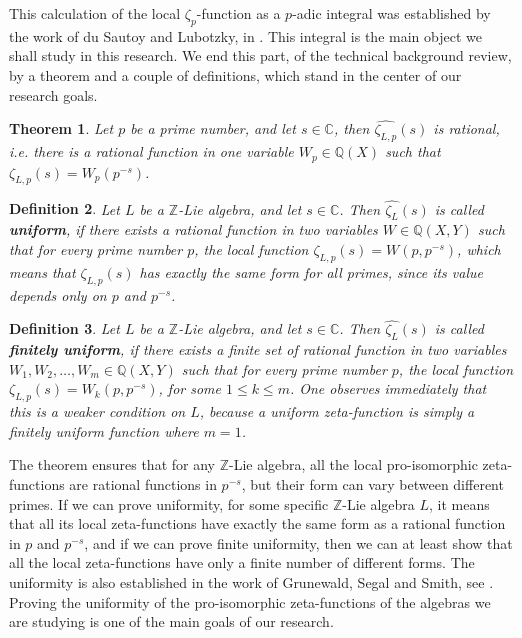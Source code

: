 \documentclass[12pt]{article}
\newtheorem{theorem}{Theorem}[subsection]
\newtheorem{definition}[theorem]{Definition}
\begin{document}
This calculation of the local $\zeta_p$-function as a $p$-adic integral was established by the work of du Sautoy and Lubotzky, in \cite{DuSautoyLubotzky}.
This integral is the main object we shall study in this research.
We end this part, of the technical background review, by a theorem and a couple of definitions, which stand in the center of our research goals.
\begin{theorem}
\label{thm.rational.function}
Let $p$ be a prime number, and let $s\in\mathbb{C}$, then $\hat{\zeta_{L,p}}(s)$ is rational, i.e. there is a rational function in one variable $W_p\in\mathbb{Q}(X)$ such that $\zeta_{L,p}(s)=W_p(p^{-s})$.
\end{theorem}
\begin{definition}
\label{def.uniform}
Let $L$ be a $\mathbb{Z}$-Lie algebra, and let $s\in\mathbb{C}$. Then $\hat{\zeta_L}(s)$ is called \textbf{uniform}, if there exists a rational function in two variables $W\in\mathbb{Q}(X,Y)$ such that for every prime number $p$, the local function $\zeta_{L,p}(s)=W(p,p^{-s})$, which means that $\zeta_{L,p}(s)$ has exactly the same form for all primes, since its value depends only on $p$ and $p^{-s}$.
\end{definition}
\begin{definition}
\label{def.finitely.uniform}
Let $L$ be a $\mathbb{Z}$-Lie algebra, and let $s\in\mathbb{C}$. Then $\hat{\zeta_L}(s)$ is called \textbf{ finitely uniform}, if there exists a finite set of rational function in two variables $W_1,W_2,\dots,W_m\in\mathbb{Q}(X,Y)$ such that for every prime number $p$, the local function $\zeta_{L,p}(s)=W_k(p,p^{-s})$, for some $1\leq k\leq m$. One observes immediately that this is a weaker condition on $L$, because a uniform zeta-function is simply a finitely uniform function where $m=1$.
\end{definition}
The theorem ensures that for any $\mathbb{Z}$-Lie algebra, all the local pro-isomorphic zeta-functions are rational functions in $p^{-s}$, but their form can vary between different primes. If we can prove uniformity, for some specific $\mathbb{Z}$-Lie algebra $L$, it means that all its local zeta-functions have exactly the same form as a rational function in $p$ and $p^{-s}$, and if we can prove finite uniformity, then we can at least show that all the local zeta-functions have only a finite number of different forms.
The uniformity is also established in the work of Grunewald, Segal and Smith, see \cite{GrunewaldSegalSmith}.
Proving the uniformity of the pro-isomorphic zeta-functions of the algebras we are studying is one of the main goals of our research.
\end{document}
